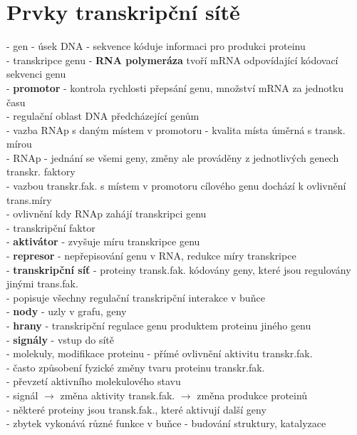 \documentclass[11pt,a4paper]{report}
\begin{document}
\section{Prvky transkripční sítě}
- gen - úsek DNA - sekvence kóduje informaci pro produkci proteinu\\
\indent - transkripce genu - \textbf{RNA polymeráza} tvoří mRNA odpovídající kódovací sekvenci genu\\  
\indent - \textbf{promotor} - kontrola rychlosti přepsání genu, množství mRNA za jednotku času\\
\indent \indent - regulační oblast DNA předcházející genům\\
\indent \indent - vazba RNAp s daným místem v promotoru - kvalita místa úměrná s transk. mírou\\
\indent - RNAp - jednání se všemi geny, změny ale prováděny z jednotlivých genech transkr. faktory\\
\indent \indent - vazbou transkr.fak. s místem v promotoru cílového genu dochází k ovlivnění trans.míry \\
\indent \indent \indent - ovlivnění kdy RNAp zahájí transkripci genu\\
\indent - transkripční faktor \\
\indent \indent - \textbf{aktivátor} - zvyšuje míru transkripce genu\\
\indent \indent - \textbf{represor} - nepřepisování genu v RNA, redukce míry transkripce\\
\indent - \textbf{transkripční síť} - proteiny transk.fak. kódovány geny, které jsou regulovány jinými trans.fak.\\
\indent \indent - popisuje všechny regulační transkripční interakce v buňce\\
\indent \indent - \textbf{nody} - uzly v grafu, geny\\
\indent \indent - \textbf{hrany} - transkripční regulace genu produktem proteinu jiného genu\\
\indent \indent - \textbf{signály} - vstup do sítě\\
\indent \indent \indent - molekuly, modifikace proteinu - přímé ovlivnění aktivitu transkr.fak.\\
\indent \indent \indent - často způsobení fyzické změny tvaru proteinu transkr.fak.\\
\indent \indent \indent \indent - převzetí aktivního molekulového stavu\\
\indent - signál $\rightarrow$ změna aktivity transk.fak. $\rightarrow$ změna produkce proteinů\\
\indent - některé proteiny jsou transk.fak., které aktivují další geny\\
\indent - zbytek vykonává různé funkce v buňce - budování struktury, katalyzace \\
\end{document}
